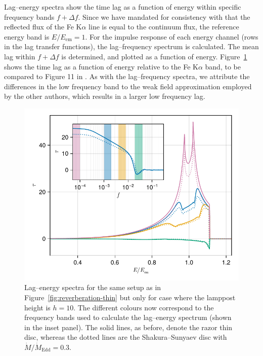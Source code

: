\documentclass[fleqn,usenatbib]{mnras}
\newcommand{\FeKa}{Fe K$\alpha$ }
\begin{document}
Lag--energy spectra show the time lag as a function of energy within specific frequency bands $f + \Delta
f$. Since we have mandated for consistency with \cite{cackett_modelling_2014}
that the reflected flux of the \FeKa line is equal to the continuum flux,
the reference energy band is $E/E_\text{em} = 1$.  For the impulse response of
each energy channel (rows in the lag transfer functions), the lag--frequency
spectrum is calculated. The mean lag within $f + \Delta f$ is determined, and
plotted as a function of energy. Figure~\ref{fig:lag-energy} shows
the time lag as a function of energy relative to the \FeKa band,
to be compared to Figure 11 in \cite{cackett_modelling_2014}. As with the
lag--frequency spectra, we attribute the differences in the low frequency band to
the weak field approximation employed by the other authors, which results in a
larger low frequency lag.

\begin{figure}
    \centering
    \includegraphics[width=0.98\columnwidth]{figures/reverberation.lag-energy.pdf}
    \caption{Lag--energy spectra for the same setup as in
        Figure~\ref{fig:reverberation-thin} but only for case where the lamppost
        height is $h=10$. The different colours now correspond to the frequency
        bands used to calculate the lag--energy spectrum (shown in the inset
        panel). The solid lines, as before, denote the razor thin disc, whereas
    the dotted lines are the Shakura--Sunyaev disc with $\dot{M} /
\dot{M}_\text{Edd} =0.3$.}
    \label{fig:lag-energy}
\end{figure}
\end{document}

